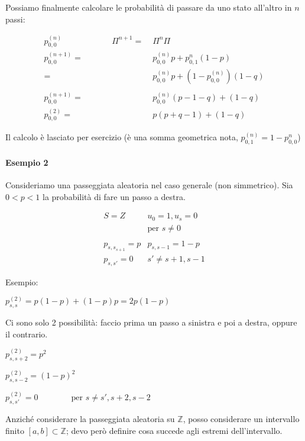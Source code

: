 \documentclass[a4paper,12pt]{book}
\begin{document}
Possiamo finalmente calcolare le probabilità di passare da uno stato all'altro in $ n $ passi:

\begin{align*}
	p_{0,0}^{(n)} \qquad \qquad \qquad \Pi^{n+1} = \; & \Pi^n \Pi \\
	p_{0,0}^{(n+1)} = \; & p_{0,0}^{(n)}p + p_{0,1}^n(1-p) \\
	= \; & p_{0,0}^{(n)}p + (1-p_{0,0}^{(n)})(1-q)  \\ \\
	p_{0,0}^{(n+1)} = \; & p_{0,0}^{(n)}(p-1-q) + (1-q)  \\
	p_{0,0}^{(2)} = \; & p(p+q-1) + (1-q) 
\end{align*}

Il calcolo è lasciato per esercizio (è una somma geometrica nota, $ p_{0,1}^{(n)} = 1-p_{0,0}^{n} $)

\paragraph{Esempio 2} Consideriamo una passeggiata aleatoria nel caso generale (non simmetrico). Sia $ 0 < p < 1 $ la probabilità di fare un passo a destra. 

$$ 
	\begin{array}{cc}
	S = Z & u_0 = 1, u_s = 0 \\
	 & \text{per } s \ne 0 \\
	 & \\
	p_{s,s_{s+1}} = p & p_{s,s-1} = 1-p \\
	p_{s,s'} = 0 & s'\ne s+1, s-1
	\end{array}
$$

Esempio: 

$ p_{s,s}^{(2)} = p(1-p) + (1-p)p = 2p(1-p) $

Ci sono solo 2 possibilità: faccio prima un passo a sinistra e poi a destra, oppure il contrario. 

$ p_{s, s+2}^{(2)} = p^2 $

$ p_{s,s-2}^{(2)}  = (1-p)^2$ 

$ p_{s,s'}^{(2)} = 0 \qquad \qquad \text{per } s \ne s', s+2, s-2$

Anziché considerare la passeggiata aleatoria su $\mathbb{Z}$, posso considerare un intervallo finito $ [a,b] \subset \mathbb{Z} $; devo però definire cosa succede agli estremi dell'intervallo. 
\end{document}
